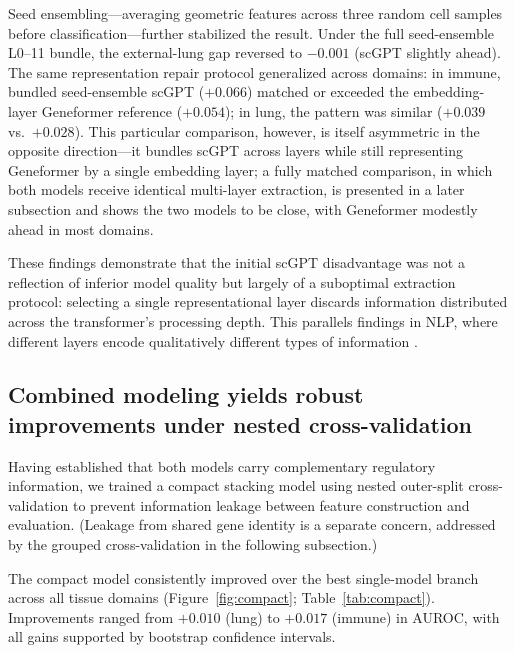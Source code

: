 \documentclass[11pt]{article}
\begin{document}
Seed ensembling---averaging geometric features across three random cell samples before classification---further stabilized the result.
Under the full seed-ensemble L0--11 bundle, the external-lung gap reversed to $-0.001$ (scGPT slightly ahead).
The same representation repair protocol generalized across domains: in immune, bundled seed-ensemble scGPT ($+0.066$) matched or exceeded the embedding-layer Geneformer reference ($+0.054$); in lung, the pattern was similar ($+0.039$ vs.\ $+0.028$).
This particular comparison, however, is itself asymmetric in the opposite direction---it bundles scGPT across layers while still representing Geneformer by a single embedding layer; a fully matched comparison, in which both models receive identical multi-layer extraction, is presented in a later subsection and shows the two models to be close, with Geneformer modestly ahead in most domains.

These findings demonstrate that the initial scGPT disadvantage was not a reflection of inferior model quality but largely of a suboptimal extraction protocol: selecting a single representational layer discards information distributed across the transformer's processing depth.
This parallels findings in NLP, where different layers encode qualitatively different types of information \cite{tenney2019bert}.

\subsection*{Combined modeling yields robust improvements under nested cross-validation}

Having established that both models carry complementary regulatory information, we trained a compact stacking model using nested outer-split cross-validation to prevent information leakage between feature construction and evaluation.
(Leakage from shared gene identity is a separate concern, addressed by the grouped cross-validation in the following subsection.)

The compact model consistently improved over the best single-model branch across all tissue domains (Figure~\ref{fig:compact}; Table~\ref{tab:compact}).
Improvements ranged from $+0.010$ (lung) to $+0.017$ (immune) in AUROC, with all gains supported by bootstrap confidence intervals.
\end{document}
